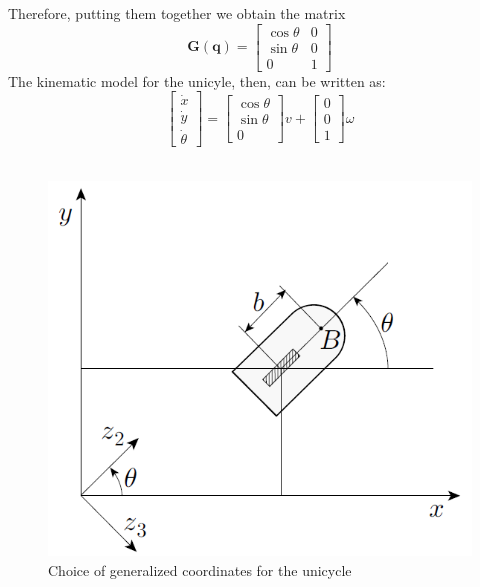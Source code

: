 \begin{multicols}{2}
    \noindent
    Therefore, putting them together we obtain the matrix
\begin{equation}
    \mathbf{G(q)}=\begin{bmatrix}
        \cos\theta&0\\
        \sin\theta&0\\
        0&1
    \end{bmatrix}
\end{equation}
The kinematic model for the unicyle, then, can be written as:
\begin{equation}
    \begin{bmatrix}
        \dot{x}\\\dot{y}\\\dot{\theta}
    \end{bmatrix}=\begin{bmatrix}
        \cos\theta\\
        \sin\theta\\
        0
    \end{bmatrix}v+\begin{bmatrix}
        0\\0\\1
    \end{bmatrix}\omega
\end{equation}
\\
\begin{figure}[H]
    \centering
    \includegraphics[scale=0.6]{img/unicycle_scheme.png}
    \caption{Choice of generalized coordinates for the unicycle}
    \label{fig:unicycle_model}
\end{figure}
\end{multicols}
